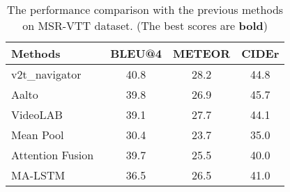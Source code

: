 \documentclass[a4paper,conference]{IEEEtran}
\begin{document}



\vspace{0.1cm}
\begin{table}[!h]
\normalsize
	\renewcommand\arraystretch{1.05}
	\centering
	\caption{The performance comparison with the previous methods on MSR-VTT dataset. (The best scores are \textbf{bold})}

\begin{tabular}{l|c|c|c}
\hline
{Methods}  
& BLEU@4  & METEOR & CIDEr \\ 
\hline
v2t\_navigator~\cite{jin2016describing} &40.8 &28.2 &44.8 \\
Aalto~\cite{shetty2016frame} &39.8 &26.9 &45.7 \\
VideoLAB~\cite{ramanishka2016multimodal} &39.1 &27.7 &44.1 \\
\hline
Mean Pool~\cite{venugopalan2014translating} &30.4 &23.7 &35.0 \\


Attention Fusion~\cite{hori2017attention} &39.7 &25.5 &40.0 \\

MA-LSTM~\cite{xu2017learning} &36.5 &26.5 &41.0 \\


\end{tabular}
\end{table}
\end{document}
